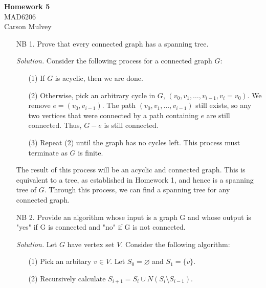\documentclass[11pt,letterpaper]{article}
\newenvironment{solution}{\color{Violet}\textit{Solution.}}{\color{black}}
\begin{document}
\begin{center}
    \begin{large}
        \textbf{Homework 5} \\
        MAD6206 \\
        Carson Mulvey
    \end{large}
\end{center}

\color{black}

\begin{enumerate}
    \item[NB 1.] Prove that every connected graph has a spanning tree.
    
    \begin{solution}
        Consider the following process for a connected graph $G$:
        \begin{enumerate}
            \item[(1)] If $G$ is acyclic, then we are done.
            \item[(2)] Otherwise, pick an arbitrary cycle in $G$,
                $(v_0,v_1,\dots,v_{i-1},v_i=v_0)$.
            We remove $e=(v_0,v_{i-1})$. The path $(v_0,v_1,\dots,v_{i-1})$ still exists, so any two vertices that were connected by a path containing $e$ are still connected. Thus, $G-e$ is still connected.
            \item[(3)] Repeat (2) until the graph has no cycles left. This process must terminate as $G$ is finite.
        \end{enumerate}
        The result of this process will be an acyclic and connected graph. This is equivalent to a tree, as established in Homework 1, and hence is a spanning tree of $G$. Through this process, we can find a spanning tree for any connected graph.
    \end{solution}

    \item[NB 2.] Provide an algorithm whose input is a graph G and whose output is "yes" if G is connected and "no" if G is not connected.
    
    \begin{solution}
        Let $G$ have vertex set $V$. Consider the following algorithm:
        \begin{enumerate}
            \item[(1)] Pick an arbitary $v\in V$. Let $S_0 = \varnothing$ and $S_1 = \{v\}$.
            \item[(2)] Recursively calculate $S_{i+1} = S_i \cup N(S_i \setminus S_{i-1})$.
            

\end{enumerate}
\end{solution}
\end{enumerate}
\end{document}
